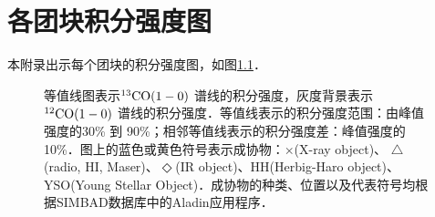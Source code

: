 \documentclass[UTF8, nocolorlinks]{pkuthss}
\newcommand{\coaa}{$\rm^{12}CO(1-0)$ }
\newcommand{\cobb}{$\rm^{13}CO(1-0)$ }
\begin{document}
\chapter{各团块积分强度图}\label{App.Map}
	
	本附录出示每个团块的积分强度图，如图\ref{Fig.Map}．

	\begin{figure}[h]
		\caption{等值线图表示\cobb 谱线的积分强度，灰度背景表示\coaa 谱线的积分强度．等值线表示的积分强度范围：由峰值强度的30\% 到 90\%；相邻等值线表示的积分强度差：峰值强度的10\%．图上的蓝色或黄色符号表示成协物：$\times$(X-ray object)、 $\triangle$(radio, {HI}, Maser)、$\Diamond$(IR object)、HH(Herbig-Haro object)、YSO(Young Stellar Object)．成协物的种类、位置以及代表符号均根据SIMBAD数据库中的Aladin应用程序．\label{Fig.Map}}
	\end{figure}
		\vspace{-18mm}
			

\backmatter




\end{document}
